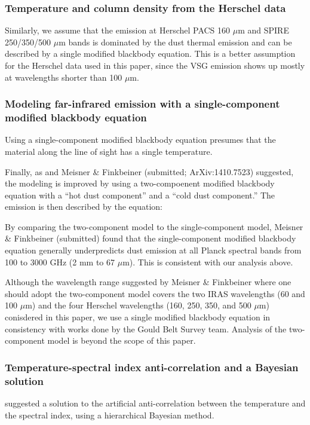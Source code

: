 \documentclass[11pt,a4paper]{emulateapj}
\begin{document}
\subsubsection{Temperature and column density from the Herschel data}
Similarly, we assume that the emission at Herschel PACS 160 $\mu$m and SPIRE 250/350/500 $\mu$m bands is dominated by the dust thermal emission and can be described by a single modified blackbody equation. This is a better assumption for the Herschel data used in this paper, since the VSG emission shows up mostly at wavelengths shorter than 100 $\mu$m.

\subsubsection{Modeling far-infrared emission with a single-component modified blackbody equation}
Using a single-component modified blackbody equation presumes that the material along the line of sight has a single temperature.

Finally, as \citet{Finkbeiner_1999} and Meisner \& Finkbeiner (submitted; ArXiv:1410.7523) suggested, the modeling is improved by using a two-compoenent modified blackbody equation with a ``hot dust component'' and a ``cold dust component.'' The emission is then described by the equation:

By comparing the two-component model to the single-component model, Meisner \& Finkbeiner (submitted) found that the single-component modified blackbody equation generally underpredicts dust emission at all Planck spectral bands from 100 to 3000 GHz (2 mm to 67 $\mu$m). This is consistent with our analysis above.

Although the wavelength range suggested by Meisner \& Finkbeiner where one should adopt the two-component model covers the two IRAS wavelengths (60 and 100 $\mu$m) and the four Herschel wavelengths (160, 250, 350, and 500 $\mu$m) conisdered in this paper, we use a single modified blackbody equation in consistency with works done by the Gould Belt Survey team. Analysis of the two-component model is beyond the scope of this paper.

\subsubsection{Temperature-spectral index anti-correlation and a Bayesian solution}

\citet{Kelly_2012} suggested a solution to the artificial anti-correlation between the temperature and the spectral index, using a hierarchical Bayesian method.
\end{document}
